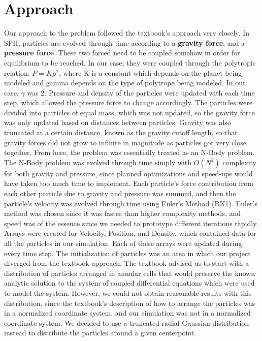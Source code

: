 \documentclass[12pt]{article}
\begin{document}
\section{Approach}
Our approach to the problem followed the textbook's approach very closely. In SPH, particles are evolved through time according to a \textbf{gravity force}, and a \textbf{pressure force}. These two forced need to be coupled somehow in order for equilibrium to be reached. In our case, they were coupled through the polytropic relation: $P=K\rho^{\gamma}$, where K is a constant which depends on the planet being modeled and gamma depends on the type of polytrope being modeled. In our case, $\gamma$ was 2.
\newline\indent
Pressure and density of the particles were updated with each time step, which allowed the pressure force to change accordingly. The particles were divided into particles of equal mass, which was not updated, so the gravity force was only updated based on distances between particles. Gravity was also truncated at a certain distance, known as the gravity cutoff length, so that gravity forces did not grow to infinite in magnitude as particles got very close together. From here, the problem was essentially treated as an N-Body problem. The N-Body problem was evolved through time simply with $O(N^2)$ complexity for both gravity and pressure, since planned optimizations and speed-ups would have taken too much time to implement. Each particle's force contribution from each other particle due to gravity and pressure was summed, and then the particle's velocity was evolved through time using Euler's Method (RK1). Euler's method was chosen since it was faster than higher complexity methods, and speed was of the essence since we needed to prototype different iterations rapidly. Arrays were created for Velocity, Position, and Density, which contained data for all the particles in our simulation. Each of these arrays were updated during every time step. 
\newline\indent
The initialization of particles was an area in which our project diverged from the textbook approach. The textbook advised us to start with a distribution of particles arranged in annular cells that would preserve the known analytic solution to the system of coupled differential equations which were used to model the system. However, we could not obtain reasonable results with this distribution, since the textbook's description of how to arrange the particles was in a normalized coordinate system, and our simulation was not in a normalized coordinate system. We decided to use a truncated radial Gaussian distribution instead to distribute the particles around a given centerpoint.
\end{document}
